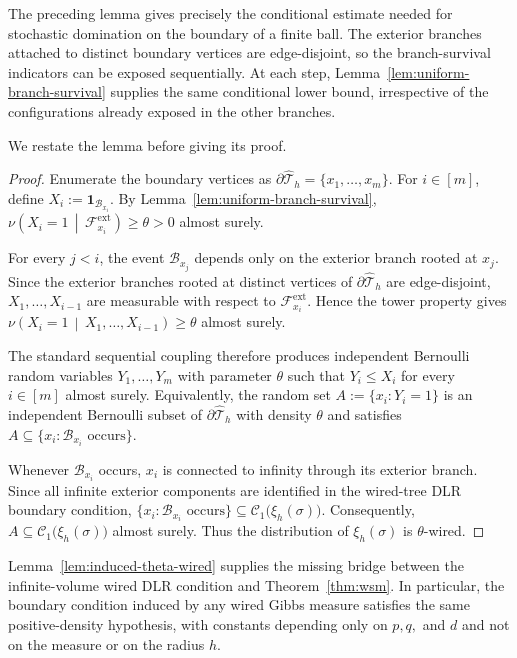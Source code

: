 \documentclass[11pt]{amsart}
\theoremstyle{plain}
\theoremstyle{definition}
\theoremstyle{remark}
\newcommand{\dreg}{\widehat {\mathcal T}_h}
\begin{document}
The preceding lemma gives precisely the conditional estimate needed for stochastic domination on the boundary of a finite ball. The exterior branches attached to distinct boundary vertices are edge-disjoint, so the branch-survival indicators can be exposed sequentially. At each step, Lemma~\ref{lem:uniform-branch-survival} supplies the same conditional lower bound, irrespective of the configurations already exposed in the other branches.

We restate the lemma before giving its proof.

\inducedThetaWired*

\begin{proof}
Enumerate the boundary vertices as $\partial\dreg=\{x_1,\ldots,x_m\}$. For $i\in[m]$, define $X_i:=\mathbf 1_{\mathcal B_{x_i}}$. By Lemma~\ref{lem:uniform-branch-survival}, $\nu\left(X_i=1\,\middle|\,\mathcal F_{x_i}^{\mathrm{ext}}\right)\ge\theta>0$ almost surely.

For every $j<i$, the event $\mathcal B_{x_j}$ depends only on the exterior branch rooted at $x_j$. Since the exterior branches rooted at distinct vertices of $\partial\dreg$ are edge-disjoint, $X_1,\ldots,X_{i-1}$ are measurable with respect to $\mathcal F_{x_i}^{\mathrm{ext}}$. Hence the tower property gives $\nu\left(X_i=1\,\middle|\,X_1,\ldots,X_{i-1}\right)\ge\theta$ almost surely.

The standard sequential coupling therefore produces independent Bernoulli random variables $Y_1,\ldots,Y_m$ with parameter $\theta$ such that $Y_i\le X_i$ for every $i\in[m]$ almost surely. Equivalently, the random set $A:=\{x_i:Y_i=1\}$ is an independent Bernoulli subset of $\partial\dreg$ with density $\theta$ and satisfies $A\subseteq\{x_i:\mathcal B_{x_i}\text{ occurs}\}$.

Whenever $\mathcal B_{x_i}$ occurs, $x_i$ is connected to infinity through its exterior branch. Since all infinite exterior components are identified in the wired-tree DLR boundary condition, $\{x_i:\mathcal B_{x_i}\text{ occurs}\}\subseteq\mathcal C_1\bigl(\xi_h(\sigma)\bigr)$. Consequently, $A\subseteq\mathcal C_1\bigl(\xi_h(\sigma)\bigr)$ almost surely. Thus the distribution of $\xi_h(\sigma)$ is $\theta$-wired.
\end{proof}

Lemma~\ref{lem:induced-theta-wired} supplies the missing bridge between the infinite-volume wired DLR condition and Theorem~\ref{thm:wsm}. In particular, the boundary condition induced by any wired Gibbs measure satisfies the same positive-density hypothesis, with constants depending only on $p,q,$ and $d$ and not on the measure or on the radius $h$.
\end{document}
